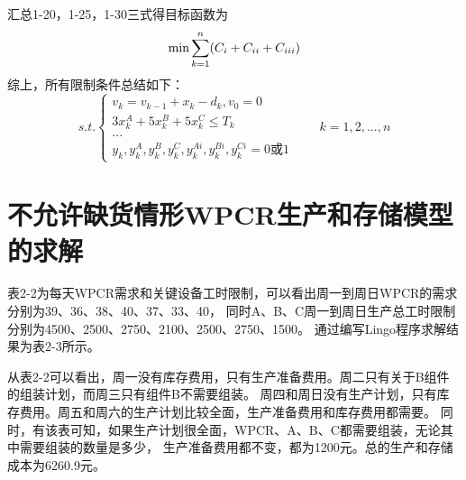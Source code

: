 汇总1-20，1-25，1-30三式得目标函数为
\begin{equation}
    \text{min}\sum_{k=1}^{n}(C_{\uppercase\expandafter{\romannumeral1}}
        + C_{\uppercase\expandafter{\romannumeral2}} 
        + C_{\uppercase\expandafter{\romannumeral3}})
\end{equation}
综上，所有限制条件总结如下：
\begin{equation}
    s.t.
    \begin{cases}
        v_k=v_{k-1}+x_k-d_k,v_0=0 \\
        3x_k^A+5x_k^B+5x_k^C \leq T_k \\
        ... \\
        y_k,y_k^A,y_k^B,y_k^C,y_k^{Ai},y_k^{Bi},y_k^{Ci}=0\text{或}1
    \end{cases} \qquad k=1,2,...,n
\end{equation}

\section{不允许缺货情形WPCR生产和存储模型的求解}
表2-2为每天WPCR需求和关键设备工时限制，可以看出周一到周日WPCR的需求分别为39、36、38、40、37、33、40，
同时A、B、C周一到周日生产总工时限制分别为4500、2500、2750、2100、2500、2750、1500。
通过编写Lingo程序求解结果为表2-3所示。

从表2-2可以看出，周一没有库存费用，只有生产准备费用。周二只有关于B组件的组装计划，而周三只有组件B不需要组装。
周四和周日没有生产计划，只有库存费用。周五和周六的生产计划比较全面，生产准备费用和库存费用都需要。
同时，有该表可知，如果生产计划很全面，WPCR、A、B、C都需要组装，无论其中需要组装的数量是多少，
生产准备费用都不变，都为1200元。总的生产和存储成本为6260.9元。